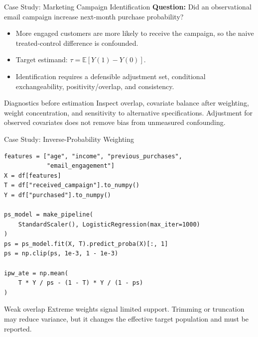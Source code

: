 \documentclass[aspectratio=169,11pt]{beamer}
\begin{document}
\begin{frame}{Case Study: Marketing Campaign Identification}
\textbf{Question:} Did an observational email campaign increase next-month purchase probability?

\begin{itemize}
  \item More engaged customers are more likely to receive the campaign, so the naive treated-control difference is confounded.
  \item Target estimand: $\tau=\mathbb{E}[Y(1)-Y(0)]$.
  \item Identification requires a defensible adjustment set, conditional exchangeability, positivity/overlap, and consistency.
\end{itemize}

\begin{block}{Diagnostics before estimation}
Inspect overlap, covariate balance after weighting, weight concentration, and sensitivity to alternative specifications. Adjustment for observed covariates does not remove bias from unmeasured confounding.
\end{block}
\end{frame}

\begin{frame}[fragile]{Case Study: Inverse-Probability Weighting}
\begin{lstlisting}[style=code,basicstyle=\ttfamily\small]
features = ["age", "income", "previous_purchases",
            "email_engagement"]
X = df[features]
T = df["received_campaign"].to_numpy()
Y = df["purchased"].to_numpy()

ps_model = make_pipeline(
    StandardScaler(), LogisticRegression(max_iter=1000)
)
ps = ps_model.fit(X, T).predict_proba(X)[:, 1]
ps = np.clip(ps, 1e-3, 1 - 1e-3)

ipw_ate = np.mean(
    T * Y / ps - (1 - T) * Y / (1 - ps)
)
\end{lstlisting}

\begin{alertblock}{Weak overlap}
Extreme weights signal limited support. Trimming or truncation may reduce variance, but it changes the effective target population and must be reported.
\end{alertblock}
\end{frame}
\end{document}
